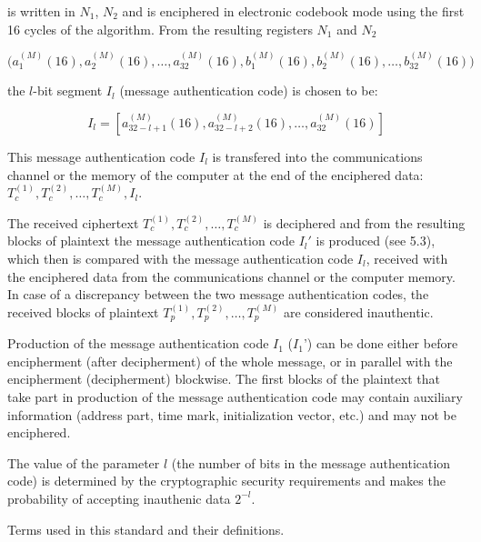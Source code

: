 is written in $N_1$, $N_2$ and is enciphered in electronic codebook mode
using the first 16 cycles of the algorithm.  From the resulting registers
$N_1$ and $N_2$

$$ \bigl(a_1^{(M)}(16), a_2^{(M)}(16), \ldots, a_{32}^{(M)}(16), 
     b_1^{(M)}(16), b_2^{(M)}(16), \ldots, b_{32}^{(M)}(16)\bigr) $$

the $l$-bit segment $I_l$ (message authentication code) is chosen
to be:

$$ I_l = [a_{32-l+1}^{(M)}(16), a_{32-l+2}^{(M)}(16), \ldots,
					a_{32}^{(M)}(16)] $$ \par

    This message authentication code $I_l$ is transfered into the
communications channel or the memory of the computer at the end of the
enciphered data: $T_c^{(1)}, T_c^{(2)}, \ldots, T_c^{(M)}, I_l$.

The received ciphertext $T_c^{(1)}, T_c^{(2)}, \ldots,
T_c^{(M)}$ is deciphered and from the resulting blocks of plaintext
the message authentication code $I_l'$ is produced (see 5.3), which
then is compared with the message authentication code $I_l$,
received with the enciphered data from the communications channel or
the computer memory.  In case of a discrepancy between the two
message authentication codes, the received blocks of plaintext
$T_p^{(1)}, T_p^{(2)}, \ldots, T_p^{(M)}$ are considered inauthentic.
\par

%

     Production of the message authentication code $I_1$ ($I_1$') can
be done either before encipherment (after decipherment) of the whole
message, or in parallel with the encipherment (decipherment)
blockwise.  The first blocks of the plaintext that take part in
production of the message authentication code may contain auxiliary
information (address part, time mark, initialization vector, etc.)
and may not be enciphered.

     The value of the parameter $l$ (the number of bits in the
message authentication code) is determined by the cryptographic
security requirements and makes the probability of accepting 
inauthenic data $2^{-l}$. \par

\par\vfill\supereject

%
	 {Terms used in this standard and their definitions.}

